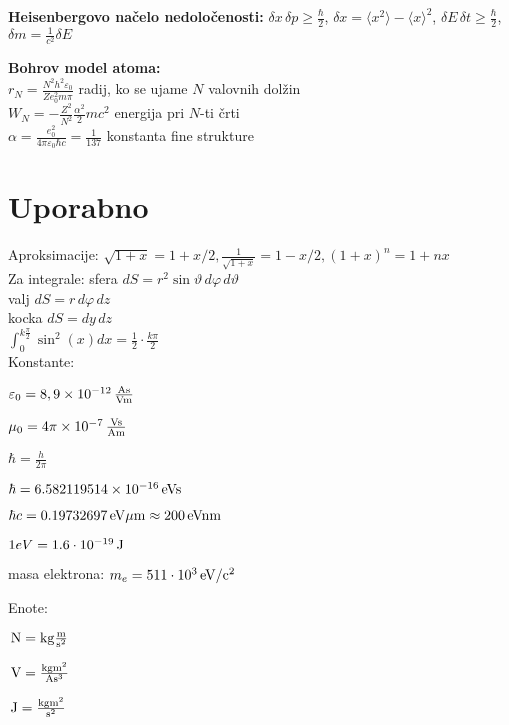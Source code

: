 \documentclass[a4paper, oneside, 12pt]{article}
\theoremstyle{definition}
\newenvironment{itemize*}{\vspace{-10pt}\begin{itemize}\setlength{\itemsep}{0pt}\setlength{\parskip}{2pt}}{\end{itemize}}
\newcommand{\eps}{\varepsilon}
\renewcommand{\theta}{\vartheta}
\begin{document}
\textbf{Heisenbergovo načelo nedoločenosti:} $\delta x\, \delta p \ge \frac{\hbar}{2}$,
$\delta x = \langle x^2 \rangle - \langle x \rangle^2$,
$\delta E\, \delta t \geq \frac{\hbar}{2}$, $\delta m = \frac{1}{c^2} \delta E$

\textbf{Bohrov model atoma:}\\
$r_N = \frac{N^2 h^2 \eps_0}{Z e_0^2 m \pi}$ radij, ko se ujame $N$ valovnih dolžin\\
$W_N = - \frac{Z^2}{N^2} \frac{\alpha^2}{2} m c^2$ energija pri $N$-ti črti\\
$\alpha = \frac{e_0^2}{4 \pi \eps_0 \hbar c} = \frac{1}{137}$ konstanta fine strukture

\section{Uporabno}
Aproksimacije: $\sqrt{1 + x} = 1 + x/2, \frac{1}{\sqrt{1+x}} = 1 - x/2, (1+x)^n = 1 + nx$\\
Za integrale: sfera $dS = r^2 \sin\theta\, d\varphi\, d\theta$\\
valj $dS = r\, d\varphi\, dz$\\
kocka $dS = dy\, dz$\\
$\int_{0}^{k\frac{\pi}{2}} \sin^2(x)dx = \frac{1}{2}\cdot \frac{k\pi}{2}$\\
Konstante:
\begin{itemize*}
  \item $\varepsilon_0 = \unit[8,9 \times 10^{-12}]{\frac{As}{Vm}}$
  \item $\mu_0 = \unit[4\pi \times 10^{-7}]{\frac{Vs}{Am}}$
  \item $\hbar = \frac{h}{2\pi}$
  \item $\hbar = \unit[6.582119514 \times 10^{-16}]{eVs}$
  \item $\hbar c = \unit[0.19732697]{eV\mu m} \approx \unit[200]{eVnm}$
  \item $1 eV = \unit[1.6 \cdot 10^{-19}]{J}$
  \item masa elektrona: $m_e = \unit[511 \cdot 10^{3}]{eV/c^2}$
\end{itemize*}
Enote:
\begin{itemize*}
\item $\unit[ ]{N} = \unit[]{kg\frac{m}{s^2}}$
\item $\unit[ ]{V} = \unit[]{\frac{kg m^2}{A s^3}}$
\item $\unit[ ]{J} = \unit[]{\frac{kg m^2}{s^2}}$
\end{itemize*}
\end{document}

